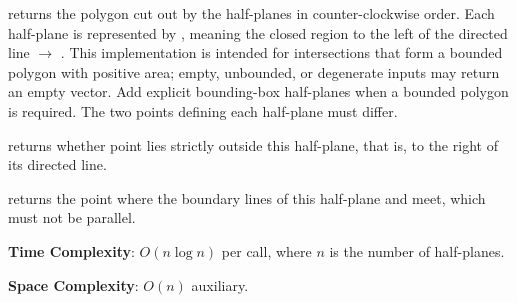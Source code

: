 \begin{compactitem}
  \item {} returns the polygon cut out by the half-planes in counter-clockwise order. Each half-plane is represented by , meaning the closed region to the left of the directed line  $\to$ . This implementation is intended for intersections that form a bounded polygon with positive area; empty, unbounded, or degenerate inputs may return an empty vector. Add explicit bounding-box half-planes when a bounded polygon is required. The two points defining each half-plane must differ.
  \item {} returns whether point  lies strictly outside this half-plane, that is, to the right of its directed line.
  \item {} returns the point where the boundary lines of this half-plane and  meet, which must not be parallel.
\end{compactitem}

\textbf{Time Complexity}: $O(n \log n)$ per call, where $n$ is the number of half-planes.

\textbf{Space Complexity}: $O(n)$ auxiliary.

